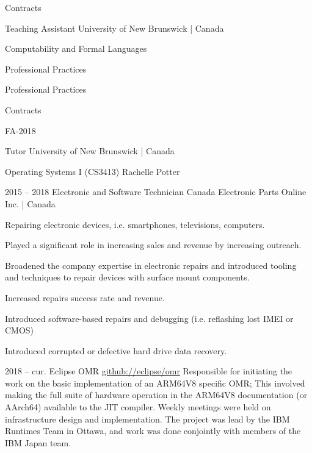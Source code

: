\documentclass{developercv} %
\begin{document}
\entrys
{
	Contracts\\
	\begin{tightemize}
	\end{tightemize}
}
{Teaching Assistant}
{University of New Brunswick | Canada}
{
	\begin{tightemize}
		\item Computability and Formal Languages
		\item Professional Practices
		\item Professional Practices
	\end{tightemize}
}

\entrys
{
	Contracts\\
	\begin{tightemize}
		\item[] {\footnotesize FA-2018}
	\end{tightemize}
}
{Tutor}
{University of New Brunswick | Canada}
{
	\begin{tightemize}
		\item Operating Systems I (CS3413) Rachelle Potter
	\end{tightemize}
}

\entrys
{2015 -- 2018}
{Electronic and Software Technician}
{Canada Electronic Parts Online Inc. | Canada}{
	Repairing electronic devices, i.e. smartphones, televisions, computers.
	\begin{tightemize}
		\item Played a significant role in increasing sales and revenue by increasing outreach.
		\item Broadened the company expertise in electronic repairs and introduced tooling and techniques to repair devices with surface mount components.
		\item Increased repairs success rate and revenue.
		\item Introduced software-based repairs and debugging (i.e. reflashing lost IMEI or CMOS)
		\item Introduced corrupted or defective hard drive data recovery.
	\end{tightemize}
}


\entrys
{2018 -- cur.}
{Eclipse OMR}
{\href{https://github.com/eclipse/omr}{github://eclipse/omr}}{
	Responsible for initiating the work on the basic implementation of an ARM64V8 specific OMR; This involved making the full suite of hardware operation in the ARM64V8 documentation (or AArch64) available to the JIT compiler.
	Weekly meetings were held on infrastructure design and implementation.
	The project was lead by the IBM Runtimes Team in Ottawa, and work was done conjointly with members of the IBM Japan team.
}
\end{document}
